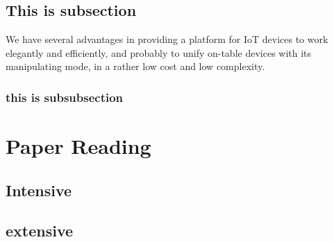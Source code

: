 \documentclass{sig-alternate-05-2015}
\begin{document}
\subsection{This is subsection}

    We have several advantages in providing a platform for IoT devices to work elegantly and efficiently, and probably to unify on-table devices with its manipulating mode, in a rather low cost and low complexity.
    
	\subsubsection{this is subsubsection}


\section{Paper Reading}

	\subsection{Intensive}
		\cite{SWless}
		\cite{SurNfc}
		\cite{WTraMag}
		\cite{magP}
		\cite{pocketC}
		\cite{wirelessALL}
	\subsection{extensive}
        \cite{6176332}
        \cite{6838830}
        \cite{7056164}
        \cite{6902086}
        \cite{Fei:2013:PPP:2512349.2514593}
        \cite{7428884}
        \cite{4782856}
	
{\small
	
	
}
\end{document}
